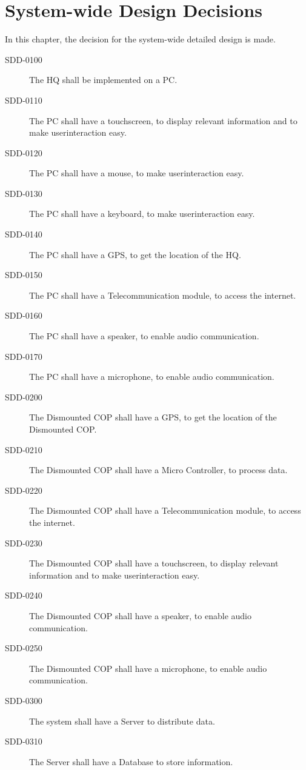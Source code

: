 \chapter{System-wide Design Decisions}

In this chapter, the decision for the system-wide detailed design is made.

\begin{description}
\item[SDD-0100] The HQ shall be implemented on a PC.
\item[SDD-0110] The PC shall have a touchscreen, to display relevant information and to make userinteraction easy.
\item[SDD-0120] The PC shall have a mouse, to make userinteraction easy.
\item[SDD-0130] The PC shall have a keyboard, to make userinteraction easy.
\item[SDD-0140] The PC shall have a GPS, to get the location of the HQ.
\item[SDD-0150] The PC shall have a Telecommunication module, to access the internet.
\item[SDD-0160] The PC shall have a speaker, to enable audio communication.
\item[SDD-0170] The PC shall have a microphone, to enable audio communication.
\item[SDD-0200] The Dismounted COP shall have a GPS, to get the location of the Dismounted COP.
\item[SDD-0210] The Dismounted COP shall have a Micro Controller, to process data.
\item[SDD-0220] The Dismounted COP shall have a Telecommunication module, to access the internet.
\item[SDD-0230] The Dismounted COP shall have a touchscreen, to display relevant information and to make userinteraction easy.
\item[SDD-0240] The Dismounted COP shall have a speaker, to enable audio communication.
\item[SDD-0250] The Dismounted COP shall have a microphone, to enable audio communication.
\item[SDD-0300] The system shall have a Server to distribute data.
\item[SDD-0310] The Server shall have a Database to store information.
\end{description}